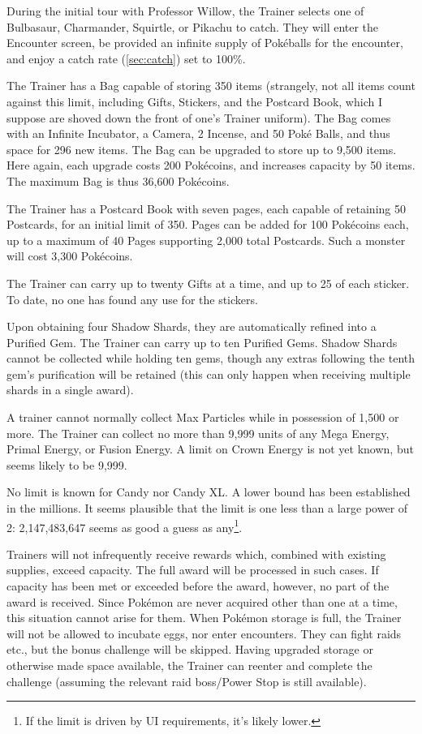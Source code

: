During the initial tour with Professor Willow, the Trainer selects one of
 Bulbasaur, Charmander, Squirtle, or Pikachu to catch.
They will enter the Encounter screen, be provided an infinite supply of
  Pokéballs for the encounter, and enjoy a catch rate (\autoref{sec:catch}) set to 100\%.

The Trainer has a Bag capable of storing 350 items (strangely, not all items
  count against this limit, including Gifts, Stickers, and the Postcard Book,
  which I suppose are shoved down the front of one's Trainer uniform).
The Bag comes with an Infinite Incubator, a Camera, 2 Incense, and 50 Poké Balls,
  and thus space for 296 new items.
The Bag can be upgraded to store up to 9,500 items.
Here again, each upgrade costs 200 Pokécoins, and increases capacity by 50 items.
The maximum Bag is thus 36,600 Pokécoins.

The Trainer has a Postcard Book with seven pages, each capable of retaining
 50 Postcards, for an initial limit of 350.
Pages can be added for 100 Pokécoins each, up to a maximum of 40 Pages
 supporting 2,000 total Postcards.
Such a monster will cost 3,300 Pokécoins.

The Trainer can carry up to twenty Gifts at a time, and up to 25 of each sticker.
To date, no one has found any use for the stickers.

Upon obtaining four Shadow Shards, they are automatically refined into a Purified Gem.
The Trainer can carry up to ten Purified Gems.
Shadow Shards cannot be collected while holding ten gems, though any extras
 following the tenth gem's purification will be retained (this can only
 happen when receiving multiple shards in a single award).

A trainer cannot normally collect Max Particles while in possession of 1,500 or more.
The Trainer can collect no more than 9,999 units of any Mega Energy,
 Primal Energy, or Fusion Energy.
A limit on Crown Energy is not yet known, but seems likely to be 9,999.

No limit is known for Candy nor Candy XL\@.
A lower bound has been established in the millions.
It seems plausible that the limit is one less than a large power of 2:
  2,147,483,647 seems as good a guess as any\footnote{If the limit is driven by UI requirements, it's likely lower.}.

Trainers will not infrequently receive rewards which, combined with existing supplies, exceed capacity.
The full award will be processed in such cases.
If capacity has been met or exceeded before the award, however, no part of the award is received.
Since Pokémon are never acquired other than one at a time, this situation cannot
 arise for them.
When Pokémon storage is full, the Trainer will not be allowed to incubate eggs,
 nor enter encounters.
They can fight raids etc., but the bonus challenge will be skipped.
Having upgraded storage or otherwise made space available, the Trainer can
 reenter and complete the challenge (assuming the relevant raid boss/Power Stop is
 still available).

